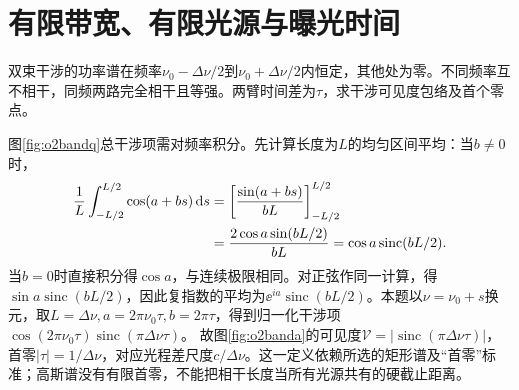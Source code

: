 \section{有限带宽、有限光源与曝光时间}
\begin{example}\label{ex:o2bandwidth}
双束干涉的功率谱在频率$\nu_0-\Delta\nu/2$到$\nu_0+\Delta\nu/2$内恒定，其他处为零。不同频率互不相干，同频两路完全相干且等强。两臂时间差为$\tau$，求干涉可见度包络及首个零点。
\end{example}
\begin{solution}
图\ref{fig:o2bandq}总干涉项需对频率积分。先计算长度为$L$的均匀区间平均：当$b\ne0$时，
\begin{align}
 \frac1L\int_{-L/2}^{L/2}\cos(a+bs)\mathop{}\!\mathrm d s
 &=\left[\frac{\sin(a+bs)}{bL}\right]_{-L/2}^{L/2}\notag\\
 &=\frac{2\cos a\sin(bL/2)}{bL}
 =\cos a\operatorname{sinc}(bL/2).\label{eq:o2rectaverage}
\end{align}
当$b=0$时直接积分得$\cos a$，与连续极限相同。对正弦作同一计算，得$\sin a\operatorname{sinc}(bL/2)$，因此复指数的平均为$\ee^{ia}\operatorname{sinc}(bL/2)$。本题以$\nu=\nu_0+s$换元，取$L=\Delta\nu,a=2\pi\nu_0\tau,b=2\pi\tau$，得到归一化干涉项$\cos(2\pi\nu_0\tau)\operatorname{sinc}(\pi\Delta\nu\tau)$。
故图\ref{fig:o2banda}的可见度$\mathcal V=|\operatorname{sinc}(\pi\Delta\nu\tau)|$，首零$|\tau|=1/\Delta\nu$，对应光程差尺度$c/\Delta\nu$。这一定义依赖所选的矩形谱及“首零”标准；高斯谱没有有限首零，不能把相干长度当所有光源共有的硬截止距离。
\end{solution}

